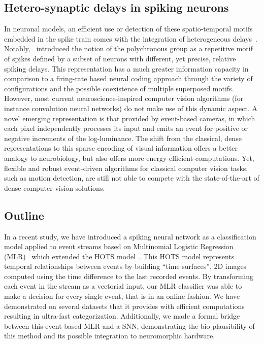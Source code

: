 \documentclass[default]{sn-jnl}%
\theoremstyle{thmstyleone}%
\theoremstyle{thmstyletwo}%
\theoremstyle{thmstylethree}%
\begin{document}
\subsection{Hetero-synaptic delays in spiking neurons}
In neuronal models, an efficient use or detection of these spatio-temporal motifs embedded in the spike train comes with the integration of heterogeneous delays~\citep{gutig_tempotron_2006, guise_bayesian_2014, zhang_supervised_2020}. Notably,~\citet{izhikevich_polychronization_2006} introduced the notion of the polychronous group as a repetitive motif of spikes defined by a subset of neurons with different, yet precise, relative spiking delays. This representation has a much greater information capacity in comparison to a firing-rate based neural coding approach through the variety of configurations and the possible coexistence of multiple superposed motifs.
However, most current neuroscience-inspired computer vision algorithms (for instance convolution neural networks) do not make use of this dynamic aspect. A novel emerging representation is that provided by event-based cameras, in which each pixel independently processes its input and emits an event for positive or negative increments of the log-luminance. The shift from the classical, dense representations to this sparse encoding of visual information offers a better analogy to neurobiology, but also offers more energy-efficient computations. Yet, flexible and robust event-driven algorithms for classical computer vision tasks, such as motion detection, are still not able to compete with the state-of-the-art of dense computer vision solutions.

\subsection{Outline}
In a recent study, we have introduced a spiking neural network as a classification model applied to event streams based on Multinomial Logistic Regression (MLR)~\citep{grimaldi_robust_2022} which extended the HOTS model~\citet{lagorce_hots_2017}. This HOTS model represents temporal relationships between events by building ``time surfaces'', 2D images computed using the time difference to the last recorded events. By transforming each event in the stream as a vectorial input, our MLR classifier was able to make a decision for every single event, that is in an online fashion. We have demonstrated on several datasets that it provides with efficient computations resulting in ultra-fast categorization. Additionally, we made a formal bridge between this event-based MLR and a SNN, demonstrating the bio-plausibility of this method and its possible integration to neuromorphic hardware.
\end{document}

